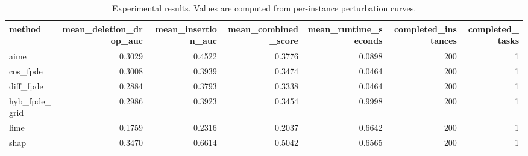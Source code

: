 \begin{table}[t]
\caption{Experimental results. Values are computed from per-instance perturbation curves.}
\label{tab:main_results_computed}
\centering
\begin{tabular}{lrrrrrr}
\toprule
method & mean\_deletion\_drop\_auc & mean\_insertion\_auc & mean\_combined\_score & mean\_runtime\_seconds & completed\_instances & completed\_tasks \\
\midrule
aime & 0.3029 & 0.4522 & 0.3776 & 0.0898 & 200 & 1 \\
cos\_fpde & 0.3008 & 0.3939 & 0.3474 & 0.0464 & 200 & 1 \\
diff\_fpde & 0.2884 & 0.3793 & 0.3338 & 0.0464 & 200 & 1 \\
hyb\_fpde\_grid & 0.2986 & 0.3923 & 0.3454 & 0.9998 & 200 & 1 \\
lime & 0.1759 & 0.2316 & 0.2037 & 0.6642 & 200 & 1 \\
shap & 0.3470 & 0.6614 & 0.5042 & 0.6565 & 200 & 1 \\
\bottomrule
\end{tabular}

\end{table}
